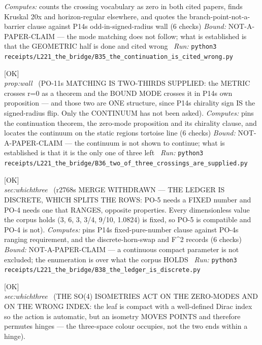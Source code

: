 \begin{description}
\emph{Computes:} counts the crossing vocabulary as zero in both cited papers, finds Kruskal 20x and horizon-regular elsewhere, and quotes the branch-point-not-a-barrier clause against P14s odd-in-signed-radius wall (6 checks)
 \emph{Bound:} NOT-A-PAPER-CLAIM --- the mode matching does not follow; what is established is that the GEOMETRIC half is done and cited wrong
\ \emph{Run:} \texttt{python3 receipts/L221\_the\_bridge/B35\_the\_continuation\_is\_cited\_wrong.py}
\item[\label{rcpt:B36_two_of_three_crossings_are_supplied}\textbf{}\quad\texttt{B36\_two\_of\_three\_crossings\_are\_supplied}]\hfill\textsf{[OK]}\\
\textit{prop:wall} \ (PO-11s MATCHING IS TWO-THIRDS SUPPLIED: the METRIC crosses r=0 as a theorem and the BOUND MODE crosses it in P14s own proposition --- and those two are ONE structure, since P14s chirality sign IS the signed-radius flip. Only the CONTINUUM has not been asked). 
\emph{Computes:} pins the continuation theorem, the zero-mode proposition and its chirality clause, and locates the continuum on the static regions tortoise line (6 checks)
 \emph{Bound:} NOT-A-PAPER-CLAIM --- the continuum is not shown to continue; what is established is that it is the only one of three left
\ \emph{Run:} \texttt{python3 receipts/L221\_the\_bridge/B36\_two\_of\_three\_crossings\_are\_supplied.py}
\item[\label{rcpt:B38_the_ledger_is_discrete}\textbf{}\quad\texttt{B38\_the\_ledger\_is\_discrete}]\hfill\textsf{[OK]}\\
\textit{sec:whichthree} \ (r2768s MERGE WITHDRAWN --- THE LEDGER IS DISCRETE, WHICH SPLITS THE ROWS: PO-5 needs a FIXED number and PO-4 needs one that RANGES, opposite properties. Every dimensionless value the corpus holds (3, 6, 3, 3/4, 9/10, 1.0824) is fixed, so PO-5 is compatible and PO-4 is not). 
\emph{Computes:} pins P14s fixed-pure-number clause against PO-4s ranging requirement, and the discrete-horn-swap and F\textasciicircum{}2 records (6 checks)
 \emph{Bound:} NOT-A-PAPER-CLAIM --- a continuous compact parameter is not excluded; the enumeration is over what the corpus HOLDS
\ \emph{Run:} \texttt{python3 receipts/L221\_the\_bridge/B38\_the\_ledger\_is\_discrete.py}
\item[\label{rcpt:B40_the_isometry_reaches_colour_not_isospin}\textbf{}\quad\texttt{B40\_the\_isometry\_reaches\_colour\_not\_isospin}]\hfill\textsf{[OK]}\\
\textit{sec:whichthree} \ (THE SO(4) ISOMETRIES ACT ON THE ZERO-MODES AND ON THE WRONG INDEX: the leaf is compact with a well-defined Dirac index so the action is automatic, but an isometry MOVES POINTS and therefore permutes hinges --- the three-space colour occupies, not the two ends within a hinge). 

\end{description}
